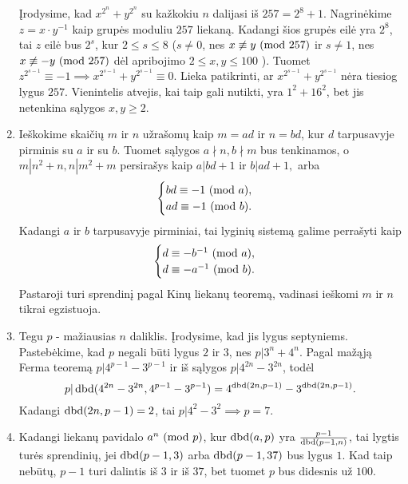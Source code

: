 \begin{enumerate}
Įrodysime, kad $x^{2^n} + y^{2^n}$ su kažkokiu $n$ dalijasi iš $257 = 2^8
+ 1$. Nagrinėkime $z = x\cdot y^{-1}$ kaip grupės moduliu $257$ liekaną.
Kadangi šios grupės eilė yra $2^8$, tai $z$ eilė bus $2^s$, kur $2\leq s \leq
8$ ($s \neq 0$, nes $x \not \equiv y \ (\text{mod } 257)$ ir $s \neq 1$, nes $x \not
\equiv -y \ (\text{mod } 257)$ dėl apribojimo $2 \leq x,y \leq 100$ ). Tuomet
$z^{2^{s-1}} \equiv -1 \implies x^{2^{s-1}} + y^{2^{s-1}} \equiv 0$.
Lieka patikrinti, ar $x^{2^{s-1}} + y^{2^{s-1}}$ nėra tiesiog lygus
$257$. Vienintelis atvejis, kai taip gali nutikti, yra $1^2 + 16^2$, bet jis
netenkina sąlygos $x,y \geq 2$. 
\item 
Ieškokime skaičių $m$ ir $n$ užrašomų kaip $m=ad$ ir $n=bd$, kur
$d$ tarpusavyje pirminis su $a$ ir su $b$. Tuomet sąlygos $a \nmid n,
b \nmid m$ bus tenkinamos, o  $m|n^2 + n, n|m^2 + m$ persirašys kaip 
$a|bd+1$ ir $b|ad+1,$ arba 
$$\begin{cases}
 bd \equiv -1 \ (\text{mod } a), \\
 ad \equiv -1 \ (\text{mod } b).
\end{cases}$$
Kadangi $a$ ir $b$ tarpusavyje pirminiai, tai lyginių sistemą galime
perrašyti kaip
$$\begin{cases}
 d \equiv -b^{-1} \ (\text{mod } a), \\
 d \equiv -a^{-1} \ (\text{mod } b).
\end{cases}$$
Pastaroji turi sprendinį pagal Kinų liekanų teoremą, vadinasi ieškomi
$m$ ir $n$ tikrai egzistuoja.
\item 
 Tegu $p$ - mažiausias $n$ daliklis. Įrodysime, kad jis lygus
 septyniems. Pastebėkime, kad $p$ negali būti lygus $2$ ir $3$, nes $p|3^n
 + 4^n.$ Pagal mažąją Ferma teoremą $p|4^{p-1} - 3^{p-1}$ ir iš
 sąlygos $p|4^{2n} - 3^{2n}$, todėl 
 $$p|\operatorname{dbd}(4^{2n} - 3^{2n}, 4^{p-1} - 3^{p-1}) = 4^{\operatorname{dbd}(2n,p-1)} -
 3^{\operatorname{dbd}(2n,p-1)}.$$ Kadangi $\operatorname{dbd}(2n,p-1) = 2$, tai $p|4^2 - 3^2
 \implies p=7$. 
\item 
Kadangi liekanų pavidalo $a^n \ (\text{mod } p)$, kur $\operatorname{dbd}(a,p)$ yra
$\frac{p-1}{\operatorname{dbd}(p-1,n)}$, tai lygtis turės sprendinių, jei
$\operatorname{dbd}(p-1,3)$ arba $\operatorname{dbd}(p-1,37)$ bus lygus $1$. Kad taip
nebūtų, $p-1$ turi dalintis iš $3$ ir iš $37$, bet tuomet $p$
bus didesnis už $100$.
\end{enumerate} 
